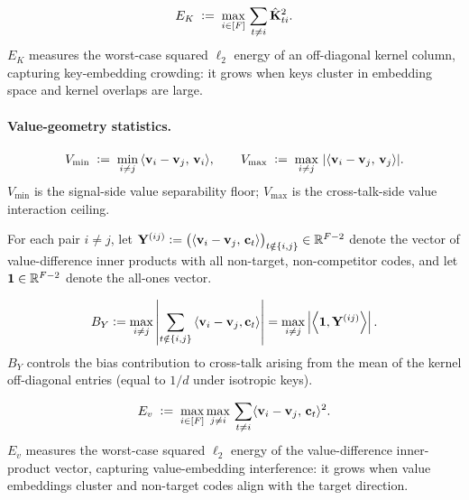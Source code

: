 \begin{definition}\label{def:Ecol}
\[
E_K \;\vcentcolon=\; \max_{i \in [F]}\, \sum_{t \neq i} \hat{\mathbf{K}}_{ti}^2.
\]
$E_K$ measures the worst-case squared $\ell_2$ energy of an off-diagonal kernel column, capturing key-embedding crowding: it grows when keys cluster in embedding space and kernel overlaps are large.
\end{definition}

\paragraph{Value-geometry statistics.}

\begin{definition}\label{def:Vmin}
\[
V_{\min} \;\vcentcolon=\; \min_{i \neq j}\, \langle {\mathbf{v}}_i - {\mathbf{v}}_j,\, {\mathbf{v}}_i \rangle,
\qquad
V_{\max} \;\vcentcolon=\; \max_{i \neq j}\, |\langle {\mathbf{v}}_i - {\mathbf{v}}_j,\, {\mathbf{v}}_j \rangle|.
\]
$V_{\min}$ is the signal-side value separability floor; $V_{\max}$ is the cross-talk-side value interaction ceiling.
\end{definition}

For each pair $i \neq j$, let $\mathbf{Y}^{(ij)} \vcentcolon= \bigl(\langle {\mathbf{v}}_i - {\mathbf{v}}_j,\, {\mathbf{c}}_t \rangle\bigr)_{t \notin \{i,j\}} \in \mathbb{R}^{F-2}$ denote the vector of value-difference inner products with all non-target, non-competitor codes, and let ${\mathbf{1}} \in \mathbb{R}^{F-2}$ denote the all-ones vector.

\begin{definition}\label{def:BY}
\[
B_Y
\vcentcolon=
\max_{i\neq j}
\left|
\sum_{t\notin\{i,j\}}
\left\langle {\mathbf{v}}_i-{\mathbf{v}}_j,{\mathbf{c}}_t\right\rangle
\right|
=
\max_{i\neq j}
\left|
\left\langle {\mathbf{1}},\mathbf{Y}^{(ij)}\right\rangle
\right|.
\]
$B_Y$ controls the bias contribution to cross-talk arising from the mean of the kernel off-diagonal entries (equal to $1/d$ under isotropic keys).
\end{definition}



\begin{definition}\label{def:EY}
\[
E_v \;\vcentcolon=\; \max_{i \in [F]}\max_{j \neq i}\, \sum_{t \neq i} \langle {\mathbf{v}}_i - {\mathbf{v}}_j,\, {\mathbf{c}}_t \rangle^2.
\]
$E_v$ measures the worst-case squared $\ell_2$ energy of the value-difference inner-product vector, capturing value-embedding interference: it grows when value embeddings cluster and non-target codes align with the target direction.
\end{definition}

